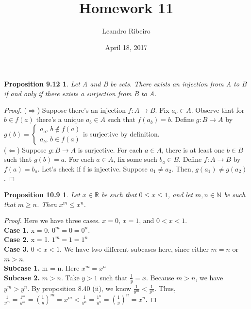 \documentclass[12pt]{amsart}
\newcommand{\N}{\mathbb{N}}
\newcommand{\R}{\mathbb{R}}
\begin{document}
\title{Homework 11}
\date{April 18, 2017}
\author{Leandro Ribeiro}

\maketitle

\newtheorem*{prop9.12}{Proposition 9.12}

\begin{prop9.12}
	Let A and B be sets. There exists an injection from A to B if and only if there exists a surjection from B to A.
\end{prop9.12}
\begin{proof}
	($\Rightarrow$) Suppose there's an injection $f: A \rightarrow B$. Fix $a_{o} \in A$. Observe that for $b \in f(a)$ there's a unique $a_b \in A$ such that $f(a_b) = b$. Define $g: B \rightarrow A$ by $g(b) =\begin{cases}
		a_o \textrm{,  }b \notin f(a)\\
		a_b \textrm{,  }b \in f(a) 
	\end{cases}$is surjective by definition.
	\\\indent($\Leftarrow$) Suppose $g: B \rightarrow A$ is surjective. For each $a \in A$, there is at least one $b \in B$ such that $g(b) =  a$. For each $a \in A$, fix some such $b_a \in B$. Define $f: A \rightarrow B$ by $f(a) = b_a$. Let's check if f is injective. Suppose $a_1 \neq a_2$. Then, $g(a_1) \neq g(a_2)$.
\end{proof}

\newtheorem*{prop10.9}{Proposition 10.9}
\begin{prop10.9}
	Let $x \in \R$ be such that $0 \leq x \leq 1$, and let $m, n \in \N$ be such that $m \geq n$. Then $x^{m} \leq x^{n}$.
\end{prop10.9}

\begin{proof}
	Here we have three cases. $x = 0$, $x = 1$, and $0 < x < 1$.
	\\\textbf{Case 1.} x = 0. $0^m = 0 = 0^n$.
	\\\textbf{Case 2.} x = 1. $1^m = 1 = 1^n$
	\\\textbf{Case 3.} $0 < x < 1$. We have two different subcases here, since either $m = n$ or $m > n$.
	\\\indent\textbf{Subcase 1.}  m = n. Here $x^m = x^n$
	\\\indent\textbf{Subcase 2.} $m > n$. Take $y > 1$ such that $\frac{1}{y} = x$. Because $m > n$, we have $y^m > y^n$. By proposition 8.40 (ii), we know $\frac{1}{y^m} < \frac{1}{y^n}$. Thus, $\frac{1}{y^m} = \frac{1^m}{y^m} = (\frac{1}{y})^m = x^m < \frac{1}{y^n} = \frac{1^n}{y^n} = (\frac{1}{y})^n = x^n$.
\end{proof}
\end{document}
